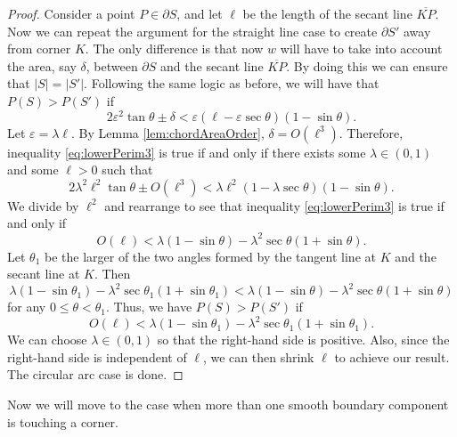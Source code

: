 \documentclass[leqno]{article}
\numberwithin{equation}{section}
\theoremstyle{definition}
\theoremstyle{remark}
\theoremstyle{plain}
\begin{document}
\begin{proof}
    Consider a point $P \in \partial S$, and let $\ell$ be the length of the secant line $\overline{KP}$. Now we can repeat the argument for the straight line case to create $\partial S'$ away from corner $K$. The only difference is that now $w$ will have to take into account the area, say $\delta$, between $\partial S$ and the secant line $\overline{KP}$. By doing this we can ensure that $|S| = |S'|$. Following the same logic as before, we will have that $P(S) > P(S')$ if
    \begin{equation}\label{eq:lowerPerim3}
        2\varepsilon^2\tan\theta  \pm \delta < \varepsilon(\ell - \varepsilon\sec\theta)(1-\sin\theta).
    \end{equation}
    Let $\varepsilon = \lambda \ell$. By Lemma \ref{lem:chordAreaOrder}, $\delta = O(\ell^3)$. Therefore, inequality \eqref{eq:lowerPerim3} is true if and only if there exists some $\lambda \in (0,1)$ and some $\ell > 0$ such that
    \[
        2\lambda^2\ell^2\tan\theta  \pm O(\ell^3) < \lambda\ell^2(1 - \lambda\sec\theta)(1-\sin\theta).
    \]
    We divide by $\ell^2$ and rearrange to see that inequality \eqref{eq:lowerPerim3} is true if and only if
    \[
        O(\ell) < \lambda(1-\sin\theta) - \lambda^2\sec\theta(1+\sin\theta).
    \]
    Let $\theta_{1}$ be the larger of the two angles formed by the tangent line at $K$ and the secant line at $K$. Then
    \[
        \lambda(1-\sin\theta_{1}) - \lambda^2\sec\theta_{1}(1+\sin\theta_{1}) < \lambda(1-\sin\theta) - \lambda^2\sec\theta(1+\sin\theta)
    \]
 for any $0\leq \theta < \theta_1$.   Thus, we have $P(S) > P(S')$ if
    \[
        O(\ell) < \lambda(1-\sin\theta_{1}) - \lambda^2\sec\theta_{1}(1+\sin\theta_{1}).
    \]
    We can choose $\lambda \in (0,1)$ so that the right-hand side is positive. Also, since the right-hand side is independent of $\ell$, we can then shrink $\ell$ to achieve our result. The circular arc case is done.
\end{proof}


Now we will move to the case when more than one smooth boundary component is touching a corner.
\end{document}
